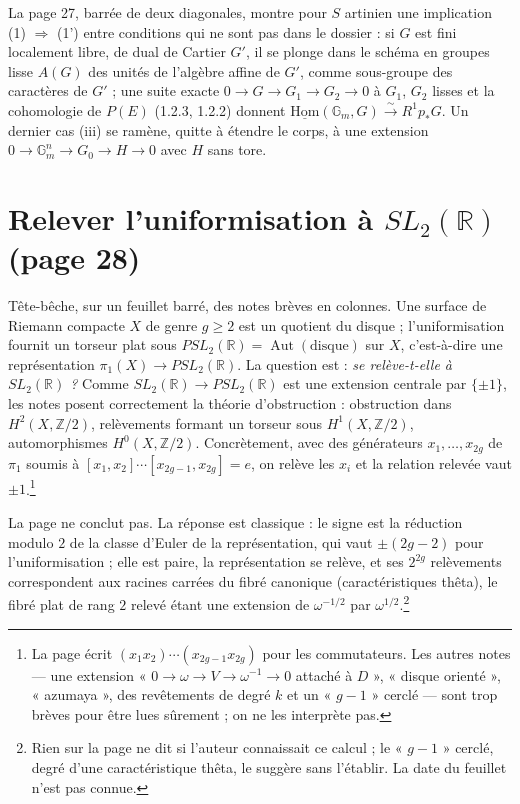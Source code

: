 \documentclass[11pt,a4paper]{article}
\begin{document}
La page 27, barrée de deux diagonales, montre pour $S$ artinien une
implication (1) $\Rightarrow$ (1') entre conditions qui ne sont pas dans le
dossier : si $G$ est fini localement libre, de dual de Cartier $G'$, il se
plonge dans le schéma en groupes lisse $A(G)$ des unités de l'algèbre affine
de $G'$, comme sous-groupe des caractères de $G'$ ; une suite exacte $0 \to G
\to G_1 \to G_2 \to 0$ à $G_1$, $G_2$ lisses et la cohomologie de $P(E)$
(1.2.3, 1.2.2) donnent $\underline{\mathrm{Hom}}(\mathbb{G}_m, G)
\xrightarrow{\sim} R^1p_*G$. Un dernier cas (iii) se ramène, quitte à étendre
le corps, à une extension $0 \to \mathbb{G}_m^n \to G_0 \to H \to 0$ avec $H$
sans tore.

\section*{Relever l'uniformisation à $SL_2(\mathbb{R})$ (page 28)}

Tête-bêche, sur un feuillet barré, des notes brèves en colonnes. Une surface
de Riemann compacte $X$ de genre $g \geqslant 2$ est un quotient du disque ;
l'uniformisation fournit un torseur plat sous $PSL_2(\mathbb{R}) =
\operatorname{Aut}(\text{disque})$ sur $X$, c'est-à-dire une représentation
$\pi_1(X) \to PSL_2(\mathbb{R})$. La question est : \emph{se relève-t-elle à
$SL_2(\mathbb{R})$ ?} Comme $SL_2(\mathbb{R}) \to PSL_2(\mathbb{R})$ est une
extension centrale par $\{\pm 1\}$, les notes posent correctement la théorie
d'obstruction : obstruction dans $H^2(X, \mathbb{Z}/2)$, relèvements formant
un torseur sous $H^1(X, \mathbb{Z}/2)$, automorphismes $H^0(X, \mathbb{Z}/2)$.
Concrètement, avec des générateurs $x_1, \dots, x_{2g}$ de $\pi_1$ soumis à
$[x_1, x_2]\cdots[x_{2g-1}, x_{2g}] = e$, on relève les $x_i$ et la relation
relevée vaut $\pm 1$.\footnote{La page écrit $(x_1x_2)\cdots(x_{2g-1}x_{2g})$
pour les commutateurs. Les autres notes --- une extension
« $0 \to \omega \to V \to \omega^{-1} \to 0$ attaché à $D$ », « disque
orienté », « azumaya », des revêtements de degré $k$ et un « $g-1$ » cerclé ---
sont trop brèves pour être lues sûrement ; on ne les interprète pas.}

La page ne conclut pas. La réponse est classique : le signe est la réduction
modulo $2$ de la classe d'Euler de la représentation, qui vaut $\pm(2g-2)$
pour l'uniformisation ; elle est paire, la représentation se relève, et ses
$2^{2g}$ relèvements correspondent aux racines carrées du fibré canonique
(caractéristiques thêta), le fibré plat de rang $2$ relevé étant une extension
de $\omega^{-1/2}$ par $\omega^{1/2}$.\footnote{Rien sur la page ne dit si
l'auteur connaissait ce calcul ; le « $g-1$ » cerclé, degré d'une
caractéristique thêta, le suggère sans l'établir. La date du feuillet n'est pas
connue.}
\end{document}
